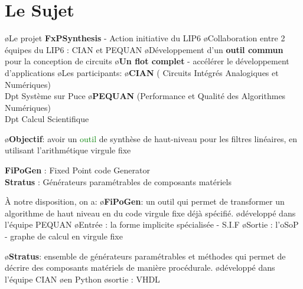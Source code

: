 \section{Le Sujet}
\begin{frame} 
    \BI
    \o Le projet \textbf{FxPSynthesis} - Action initiative du LIP6
       \BI
       \o Collaboration entre 2 équipes du LIP6 : CIAN et PEQUAN
       \o Développement d'un \textbf{outil commun} pour la conception de circuits
       \o \textbf{Un flot complet} - accélérer le développement d'applications 
       \EI
	\smallskip
    \o Les participants:
		\BI
		\o \textbf{CIAN} ( Circuits Intégrés Analogiques et Numériques) \\ \hspace{1cm}Dpt Système sur Puce
		\o \textbf{PEQUAN} (Performance et Qualité des Algorithmes Numériques) \\ \hspace{1cm}Dpt Calcul Scientifique
		\EI
    \EI
\end{frame} 

\begin{frame} 
    \BI
    \o \textbf{Objectif}: avoir un \textcolor{green}{outil} de synthèse de haut-niveau pour les filtres linéaires, en utilisant l'arithmétique virgule fixe 
	\vspace{0.7cm}
	\begin{center}
	\end{center}			
	\EI
	\smallskip
	\hspace*{1cm}
	\textbf{FiPoGen }: Fixed Point code Generator \\
	\textbf{Stratus} : Générateurs paramétrables de composants matériels
\end{frame}


\begin{frame} 

	\`A notre disposition, on a:
		\BI 
		\o \textbf{FiPoGen}: un outil qui permet de transformer un algorithme de haut niveau en du code virgule fixe déjà spécifié. 
			\BI
				\o développé dans l'équipe PEQUAN
				\o Entrée : la forme implicite spécialisée - S.I.F
				\o Sortie : l'oSoP - graphe de calcul en virgule fixe
			\EI

		\bigskip
		\o \textbf{Stratus}: ensemble de générateurs paramétrables et méthodes qui permet de décrire des composants matériels de manière procédurale.	
			\BI
				\o développé dans l'équipe CIAN
				\o en Python
				\o sortie : VHDL
			\EI
		\EI 

\end{frame}

